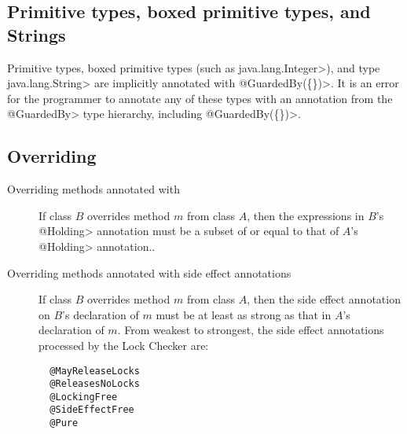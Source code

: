 \subsection{Primitive types, boxed primitive types, and Strings\label{lock-type-checking-rules-primitives}}

Primitive types, boxed primitive types (such as \<java.lang.Integer>), and type \<java.lang.String>
are implicitly annotated with \<@GuardedBy(\{\})>.
It is an error for the programmer to annotate any of these types with an annotation from
the \<@GuardedBy> type hierarchy, including \<@GuardedBy(\{\})>.


\subsection{Overriding\label{lock-type-checking-rules-overriding}}

\begin{description}

\item[Overriding methods annotated with ]
  If class $B$ overrides method $m$ from class $A$, then the expressions in
  $B$'s \<@Holding>
  annotation must be a subset of or equal to that of $A$'s \<@Holding>
  annotation..

\item[Overriding methods annotated with side effect annotations]
  If class $B$ overrides method $m$ from class $A$, then
  the side effect annotation on $B$'s declaration of $m$
  must be at least as strong as that in $A$'s declaration of $m$.
  From weakest to strongest, the side effect annotations
  processed by the Lock Checker are:
\begin{verbatim}
  @MayReleaseLocks
  @ReleasesNoLocks
  @LockingFree
  @SideEffectFree
  @Pure
\end{verbatim}

\end{description}

